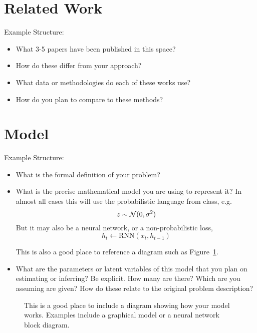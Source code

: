 \documentclass{article}
\begin{document}
\section{Related Work}

Example Structure:
\begin{itemize}
\item What 3-5 papers have been published in this space?
\item How do these  differ from your approach?
\item What data or methodologies do each of these works use?
\item How do you plan to compare to these methods?
\end{itemize}




\section{Model}

Example Structure:

\begin{itemize}
\item What is the formal definition of your problem?
\item What is the precise mathematical model you are using to represent it? In almost all cases this will use the probabilistic language from class, e.g.
  \begin{equation}
  z \sim {\cal N}(0, \sigma^2)\label{eq:1}
\end{equation}
But it may also be a neural network, or a non-probabilistic loss,
\[ h_t \gets \mathrm{RNN}(x_{t}, h_{t-1} )\]

This is also a good place to reference a diagram such as Figure~\ref{fig:diagram}.

\item What are the parameters or latent variables of this model that you plan on estimating or inferring? Be explicit. How many are there? Which are you assuming are given? How do these relate to the original problem description?
\end{itemize}



\begin{figure}
  \centering
  \missingfigure[figheight=8cm]{}
  \caption{\label{fig:diagram} This is a good place to include a diagram showing how your model works. Examples include a graphical model or a neural network block diagram.}
\end{figure}
\end{document}
